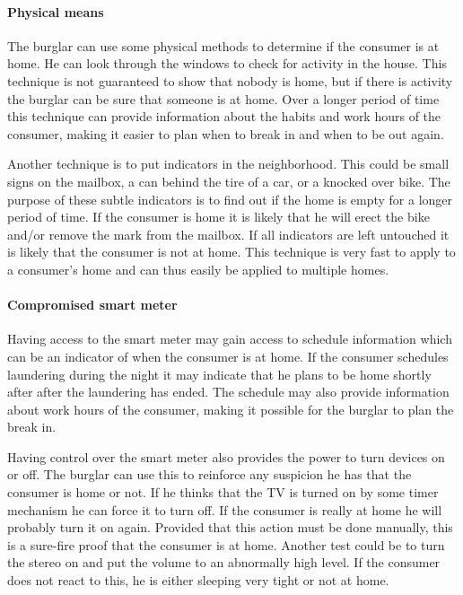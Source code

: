 \paragraph{Physical means}
The burglar can use some physical methods to determine if the consumer is at home.
He can look through the windows to check for activity in the house.	
This technique is not guaranteed to show that nobody is home, but if there is activity the burglar can be sure that someone is at home.
Over a longer period of time this technique can provide information about the habits and work hours of the consumer, making it easier to plan when to break in and when to be out again.

Another technique is to put indicators in the neighborhood.
This could be small signs on the mailbox, a can behind the tire of a car, or a knocked over bike.
The purpose of these subtle indicators is to find out if the home is empty for a longer period of time.
If the consumer is home it is likely that he will erect the bike and/or remove the mark from the mailbox.
If all indicators are left untouched it is likely that the consumer is not at home.
This technique is very fast to apply to a consumer's home and can thus easily be applied to multiple homes.

\paragraph{Compromised smart meter}
Having access to the smart meter may gain access to schedule information which can be an indicator of when the consumer is at home.
If the consumer schedules laundering during the night it may indicate that he plans to be home shortly after after the laundering has ended.
The schedule may also provide information about work hours of the consumer, making it possible for the burglar to plan the break in.

Having control over the smart meter also provides the power to turn devices on or off.
The burglar can use this to reinforce any suspicion he has that the consumer is home or not.
If he thinks that the TV is turned on by some timer mechanism he can force it to turn off.
If the consumer is really at home he will probably turn it on again.
Provided that this action must be done manually, this is a sure-fire proof that the consumer is at home.
Another test could be to turn the stereo on and put the volume to an abnormally high level.
If the consumer does not react to this, he is either sleeping very tight or not at home.

